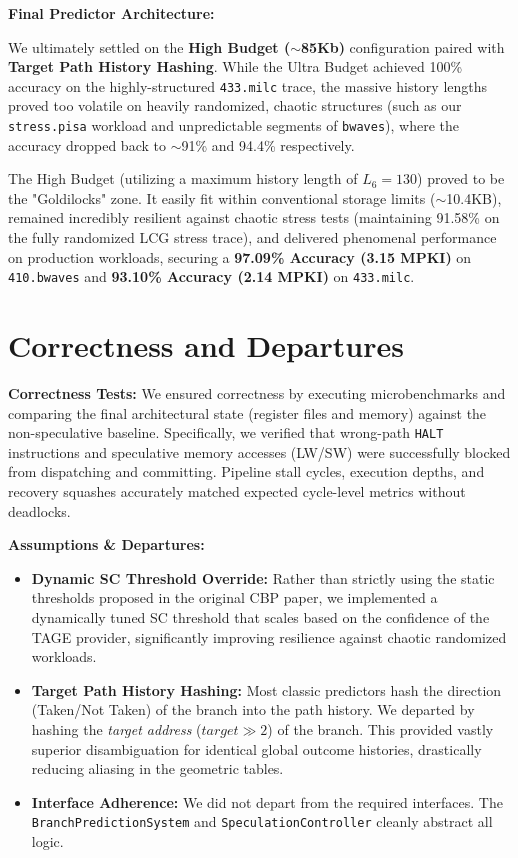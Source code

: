 \documentclass[11pt, a4paper]{article}
\begin{document}
\textbf{Final Predictor Architecture:}

We ultimately settled on the \textbf{High Budget ($\sim$85Kb)} configuration paired with \textbf{Target Path History Hashing}. 
While the Ultra Budget achieved 100\% accuracy on the highly-structured \texttt{433.milc} trace, the massive history lengths proved too volatile on heavily randomized, chaotic structures (such as our \texttt{stress.pisa} workload and unpredictable segments of \texttt{bwaves}), where the accuracy dropped back to $\sim$91\% and 94.4\% respectively.

The High Budget (utilizing a maximum history length of $L_6=130$) proved to be the "Goldilocks" zone. It easily fit within conventional storage limits ($\sim$10.4KB), remained incredibly resilient against chaotic stress tests (maintaining 91.58\% on the fully randomized LCG stress trace), and delivered phenomenal performance on production workloads, securing a \textbf{97.09\% Accuracy (3.15 MPKI)} on \texttt{410.bwaves} and \textbf{93.10\% Accuracy (2.14 MPKI)} on \texttt{433.milc}.

\section{Correctness and Departures}

\textbf{Correctness Tests:}
We ensured correctness by executing microbenchmarks and comparing the final architectural state (register files and memory) against the non-speculative baseline. Specifically, we verified that wrong-path \texttt{HALT} instructions and speculative memory accesses (LW/SW) were successfully blocked from dispatching and committing. Pipeline stall cycles, execution depths, and recovery squashes accurately matched expected cycle-level metrics without deadlocks.

\textbf{Assumptions \& Departures:}
\begin{itemize}
    \item \textbf{Dynamic SC Threshold Override:} Rather than strictly using the static thresholds proposed in the original CBP paper, we implemented a dynamically tuned SC threshold that scales based on the confidence of the TAGE provider, significantly improving resilience against chaotic randomized workloads.
    \item \textbf{Target Path History Hashing:} Most classic predictors hash the direction (Taken/Not Taken) of the branch into the path history. We departed by hashing the \textit{target address} ($target \gg 2$) of the branch. This provided vastly superior disambiguation for identical global outcome histories, drastically reducing aliasing in the geometric tables.
    \item \textbf{Interface Adherence:} We did not depart from the required interfaces. The \texttt{BranchPredictionSystem} and \texttt{SpeculationController} cleanly abstract all logic.
\end{itemize}
\end{document}
